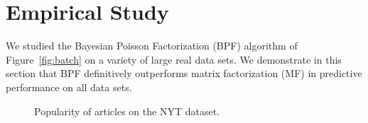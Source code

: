 \section{Empirical Study}
We studied the Bayesian Poisson Factorization (BPF) algorithm of
Figure~\ref{fig:batch} on a variety of large real data sets. We
demonstrate in this section that BPF definitively outperforms matrix
factorization (MF) in predictive performance on all data sets.
\begin{figure}[th]
\centering
{}
\caption{Popularity of articles on the NYT dataset.}
\label{fig:nyt-expl}
\end{figure}


